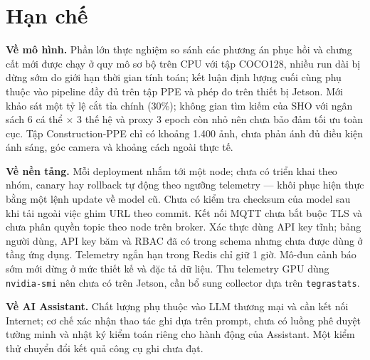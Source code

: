 \section{Hạn chế}

\textbf{Về mô hình.} Phần lớn thực nghiệm so sánh các phương án phục hồi và
chưng cất mới được chạy ở quy mô sơ bộ trên CPU với tập COCO128, nhiều run dài bị
dừng sớm do giới hạn thời gian tính toán; kết luận định lượng cuối cùng phụ thuộc
vào pipeline đầy đủ trên tập PPE và phép đo trên thiết bị Jetson. Mới khảo sát một
tỷ lệ cắt tỉa chính (30\%); không gian tìm kiếm của SHO với ngân sách 6 cá thể
$\times$ 3 thế hệ và proxy 3 epoch còn nhỏ nên chưa bảo đảm tối ưu toàn cục.
Tập Construction-PPE chỉ có khoảng 1.400 ảnh, chưa phản ánh đủ điều kiện ánh sáng,
góc camera và khoảng cách ngoài thực tế.

\textbf{Về nền tảng.} Mỗi deployment nhắm tới một node; chưa có triển khai theo
nhóm, canary hay rollback tự động theo ngưỡng telemetry --- khôi phục hiện thực
bằng một lệnh update về model cũ. Chưa có kiểm tra checksum của model sau khi tải
ngoài việc ghim URL theo commit. Kết nối MQTT chưa bắt buộc TLS và chưa phân
quyền topic theo node trên broker. Xác thực dùng API key tĩnh; bảng người dùng,
API key băm và RBAC đã có trong schema nhưng chưa được dùng ở tầng ứng dụng.
Telemetry ngắn hạn trong Redis chỉ giữ 1 giờ. Mô-đun cảnh báo sớm mới dừng ở
mức thiết kế và đặc tả dữ liệu. Thu telemetry GPU dùng \texttt{nvidia-smi} nên chưa
có trên Jetson, cần bổ sung collector dựa trên \texttt{tegrastats}.

\textbf{Về AI Assistant.} Chất lượng phụ thuộc vào LLM thương mại và cần kết nối
Internet; cơ chế xác nhận thao tác ghi dựa trên prompt, chưa có luồng phê duyệt
tường minh và nhật ký kiểm toán riêng cho hành động của Assistant. Một kiểm thử
chuyển đổi kết quả công cụ ghi chưa đạt.
